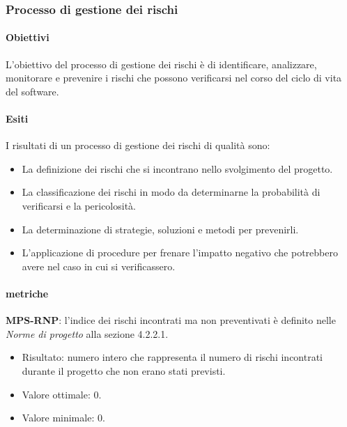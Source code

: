 \documentclass[../piano-di-qualifica.tex]{subfiles}
\begin{document}
\subsubsection{Processo di gestione dei rischi}%
\label{sub:processo_di_gestione_dei_rischi}

\paragraph{Obiettivi}%
\label{par:obiettivi}

L'obiettivo del processo di gestione dei rischi è di identificare, analizzare, monitorare e prevenire i rischi che possono verificarsi nel corso del ciclo di vita del software.

\paragraph{Esiti}%
\label{par:esiti}

I risultati di un processo di gestione dei rischi di qualità sono:
\begin{itemize}
  \item La definizione dei rischi che si incontrano nello svolgimento del progetto.
  \item La classificazione dei rischi in modo da determinarne la probabilità di verificarsi e la pericolosità.
  \item La determinazione di strategie, soluzioni e metodi per prevenirli.
  \item L'applicazione di procedure per frenare l'impatto negativo che potrebbero avere nel caso in cui si verificassero.
\end{itemize}

\paragraph{metriche}%
\label{par:metriche}

\textbf{MPS-RNP}: l'indice dei rischi incontrati ma non preventivati è definito nelle \textit{Norme di progetto} alla sezione 4.2.2.1.
\begin{itemize}
  \item Risultato: numero intero che rappresenta il numero di rischi incontrati durante il progetto che non erano stati previsti.
  \item Valore ottimale: 0.
  \item Valore minimale: 0.
\end{itemize}
\end{document}
